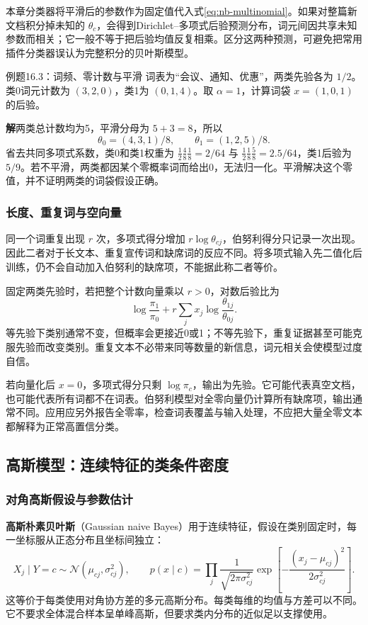 \documentclass[UTF8,fontset=none,zihao=-4,a4paper]{ctexart}
\newcommand{\term}[1]{\textbf{#1}}
\newcommand{\sol}{\par\noindent\textbf{解}\quad}
\numberwithin{equation}{section}
\numberwithin{figure}{section}
\begin{document}
本章分类器将平滑后的参数作为固定值代入式\eqref{eq:nb-multinomial}。如果对整篇新文档积分掉未知的 $\theta_c$，会得到Dirichlet--多项式后验预测分布，词元间因共享未知参数而相关；它一般不等于把后验均值反复相乘。区分这两种预测，可避免把常用插件分类器误认为完整积分的贝叶斯模型。

\begin{infobox}[unbreakable]{例题16.3：词频、零计数与平滑}
词表为“会议、通知、优惠”，两类先验各为 $1/2$。类0词元计数为 $(3,2,0)$，类1为 $(0,1,4)$。取 $\alpha=1$，计算词袋 $x=(1,0,1)$ 的后验。
\sol 两类总计数均为5，平滑分母为 $5+3=8$，所以
\[
 \theta_0=(4,3,1)/8,\qquad\theta_1=(1,2,5)/8.
\]
省去共同多项式系数，类0和类1权重为 $\frac12\frac48\frac18=2/64$ 与 $\frac12\frac18\frac58=2.5/64$，类1后验为 $5/9$。若不平滑，两类都因某个零概率词而给出0，无法归一化。平滑解决这个零值，并不证明两类的词袋假设正确。
\end{infobox}

\subsubsection{长度、重复词与空向量}
同一个词重复出现 $r$ 次，多项式得分增加 $r\log\theta_{cj}$，伯努利得分只记录一次出现。因此二者对于长文本、重复宣传词和缺席词的反应不同。将多项式输入先二值化后训练，仍不会自动加入伯努利的缺席项，不能据此称二者等价。

固定两类先验时，若把整个计数向量乘以 $r>0$，对数后验比为
\[
 \log\frac{\pi_1}{\pi_0}
 +r\sum_jx_j\log\frac{\theta_{1j}}{\theta_{0j}}.
\]
等先验下类别通常不变，但概率会更接近0或1；不等先验下，重复证据甚至可能克服先验而改变类别。重复文本不必带来同等数量的新信息，词元相关会使模型过度自信。

若向量化后 $x=0$，多项式得分只剩 $\log\pi_c$，输出为先验。它可能代表真空文档，也可能代表所有词都不在词表。伯努利模型对全零向量仍计算所有缺席项，输出通常不同。应用应另外报告全零率，检查词表覆盖与输入处理，不应把大量全零文本都解释为正常高置信分类。

\subsection{高斯模型：连续特征的类条件密度}
\subsubsection{对角高斯假设与参数估计}
\term{高斯朴素贝叶斯}（Gaussian naive Bayes）用于连续特征，假设在类别固定时，每一坐标服从正态分布且坐标间独立：
\[
 X_j\mid Y=c\sim\mathcal N(\mu_{cj},\sigma_{cj}^2),\qquad
 p(x\mid c)=\prod_j\frac{1}{\sqrt{2\pi\sigma_{cj}^2}}
 \exp\left[-\frac{(x_j-\mu_{cj})^2}{2\sigma_{cj}^2}\right].
\]
这等价于每类使用对角协方差的多元高斯分布。每类每维的均值与方差可以不同。它不要求全体混合样本呈单峰高斯，但要求类内分布的近似足以支撑使用。
\end{document}
